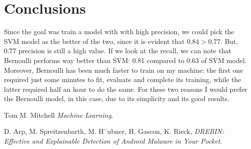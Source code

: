 \documentclass[12pt]{article}
\begin{document}
\section{Conclusions}
Since the goal was train a model with with high precision, we could pick the SVM model as the better of the two, since it is evident that $0.84 > 0.77$. But, 0.77 precision is still a high value. If we look at the recall, we can note that Bernoulli performs way better than SVM: 0.81 compared to 0.63 of SVM model. Moreover, Bernoulli has been much faster to train on my machine: the first one required just some minutes to fit, evaluate and complete its training, while the latter required half an hour to do the same. For these two reasons I would prefer the Bernoulli model, in this case, due to its simplicity and its good results. 

\newpage
\begin{thebibliography}{10}
	
	Tom M. Mitchell \textsl{Machine Learning}.
	
	D. Arp, M. Spreitzenbarth, M. H¨ubner, H. Gascon, K. Rieck, \textsl{DREBIN: Effective and Explainable Detection of Android Malware in Your Pocket}.
	
\end{thebibliography}
\end{document}
